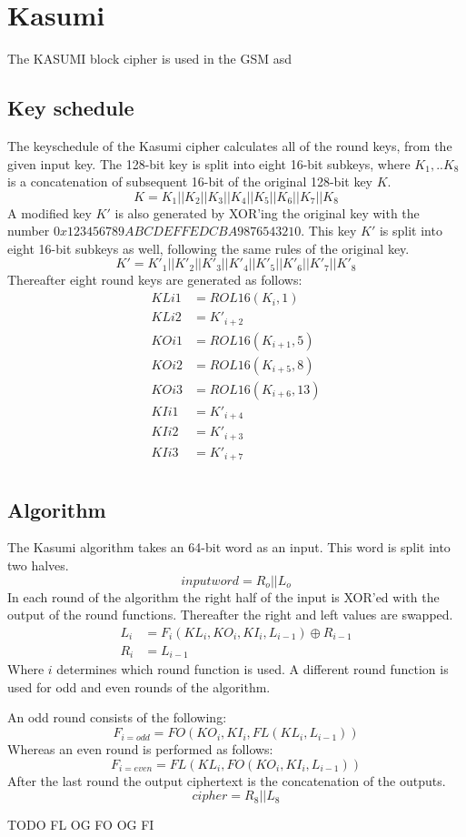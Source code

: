 \chapter{Kasumi}
\label{ch:kas}
The KASUMI block cipher is used in the GSM asd
\section{Key schedule}
The keyschedule of the Kasumi cipher calculates all of the round keys,
from the given input key. The 128-bit key is split into eight 16-bit
subkeys, where $K_1,..K_8$ is a concatenation of subsequent 16-bit of
the original 128-bit key $K$.
\[K = K_1 || K_2 || K_3 || K_4 || K_5 || K_6 || K_7 || K_8\]
A modified key $K'$ is also generated by XOR'ing the original key with
the number $0x123456789ABCDEFFEDCBA9876543210$. This key $K'$ is split
into eight 16-bit subkeys as well, following the same rules of the
original key.
\[K' = K'_1 || K'_2 || K'_3 || K'_4 || K'_5 || K'_6 || K'_7 || K'_8\]
Thereafter eight round keys are generated as follows:
\begin{align*}
  KLi1 &= ROL16(K_i,1)\\
  KLi2 &= K'_{i+2}\\
  KOi1 &= ROL16(K_{i + 1},5)\\
  KOi2 &= ROL16(K_{i + 5},8)\\
  KOi3 &= ROL16(K_{i + 6},13)\\
  KIi1 &= K'_{i+4}\\
  KIi2 &= K'_{i+3}\\
  KIi3 &= K'_{i+7}\\
\end{align*}

\section{Algorithm}
The Kasumi algorithm takes an 64-bit word as an input. This word is
split into two halves.
\[ inputword = R_o || L_o\]
In each round of the algorithm the right half of the input is XOR'ed
with the output of the round functions. Thereafter the right and left
values are swapped. 
\begin{align*}
  L_i &= F_i(KL_i,KO_i,KI_i,L_{i - 1}) \oplus R_{i - 1} \\
  R_i &= L_{i - 1}
\end{align*}
Where $i$ determines which round function is used. A different round
function is used for odd and even rounds of the algorithm.

An odd round consists of the following:
\[F_{i = odd} = FO(KO_i, KI_i, FL(KL_i, L_{i - 1})) \]
Whereas an even round is performed as follows:
\[F_{i = even} = FL(KL_i, FO(KO_i,KI_i, L_{i - 1})) \]
After the last round the output ciphertext is the concatenation of the
outputs.
\[cipher = R_8 || L_8\]

TODO
FL OG FO OG FI

